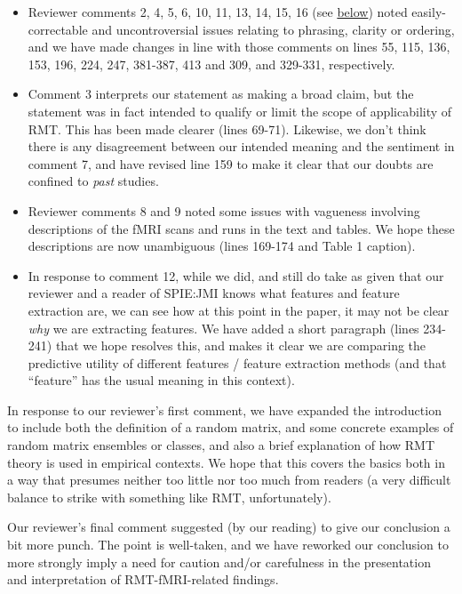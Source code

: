 \documentclass[10pt,letter]{article}
\begin{document}
\begin{itemize}
\item Reviewer comments 2, 4, 5, 6, 10, 11, 13, 14, 15, 16 (see \hyperref[comments]{below}) noted easily-correctable
and uncontroversial issues relating to phrasing, clarity or ordering, and we
have made changes in line with those comments on lines 55, 115, 136, 153,
196, 224, 247, 381-387, 413 and 309, and 329-331, respectively.

\item Comment 3 interprets our statement as making a broad claim, but the statement
was in fact intended to qualify or limit the scope of applicability of RMT.
This has been made clearer (lines 69-71). Likewise, we don't think there is
any disagreement between our intended meaning and the sentiment in comment 7,
and have revised line 159 to make it clear that our doubts are confined to
\textit{past} studies.

\item Reviewer comments 8 and 9 noted some issues with vagueness involving
descriptions of the fMRI scans and runs in the text and tables. We hope these
descriptions are now unambiguous (lines 169-174 and Table 1 caption).

\item In response to comment 12, while we did, and still do take as given that our
reviewer and a reader of SPIE:JMI knows what features and feature extraction
are, we can see how at this point in the paper, it may not be clear
\textit{why} we are extracting features. We have added a short paragraph (lines
234-241) that we hope resolves this, and makes it clear we are comparing the
predictive utility of different features / feature extraction methods (and that
``feature'' has the usual meaning in this context).
\end{itemize}


In response to our reviewer's first comment, we have expanded the introduction
to include both the definition of a random matrix, and some concrete examples of
random matrix ensembles or classes, and also a brief explanation of how RMT
theory is used in empirical contexts. We hope that this covers the basics both
in a way that presumes neither too little nor too much from readers (a very
difficult balance to strike with something like RMT, unfortunately).


Our reviewer's final comment suggested (by our reading) to give our conclusion
a bit more punch. The point is well-taken, and we have reworked our conclusion
to more strongly imply a need for caution and/or carefulness in the
presentation and interpretation of RMT-fMRI-related findings.
\end{document}
